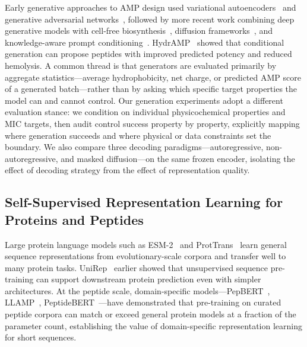 Early generative approaches to AMP design used variational
autoencoders~\citep{pepvae} and generative adversarial
networks~\citep{gupta2018}, followed by more recent work combining deep
generative models with cell-free biosynthesis~\citep{pandi2023}, diffusion
frameworks~\citep{diffamp}, and knowledge-aware prompt
conditioning~\citep{kppepgen}.
HydrAMP~\citep{hydramp} showed that conditional generation can propose
peptides with improved predicted potency and reduced hemolysis.
A common thread is that generators are evaluated primarily by aggregate
statistics---average hydrophobicity, net charge, or predicted AMP score of
a generated batch---rather than by asking which specific target properties
the model can and cannot control.
Our generation experiments adopt a different evaluation stance: we condition
on individual physicochemical properties and MIC targets, then audit control
success property by property, explicitly mapping where generation succeeds
and where physical or data constraints set the boundary.
We also compare three decoding paradigms---autoregressive, non-autoregressive,
and masked diffusion---on the same frozen encoder, isolating the effect of
decoding strategy from the effect of representation quality.

\subsection{Self-Supervised Representation Learning for Proteins and Peptides}

Large protein language models such as ESM-2~\citep{esm2} and
ProtTrans~\citep{prottrans} learn general sequence representations from
evolutionary-scale corpora and transfer well to many protein tasks.
UniRep~\citep{unirep} earlier showed that unsupervised sequence pre-training
can support downstream protein prediction even with simpler architectures.
At the peptide scale, domain-specific models---PepBERT~\citep{pepbert},
LLAMP~\citep{llamp}, PeptideBERT~\citep{peptidebert}---have demonstrated
that pre-training on curated peptide corpora can match or exceed general
protein models at a fraction of the parameter count, establishing the value
of domain-specific representation learning for short sequences.

